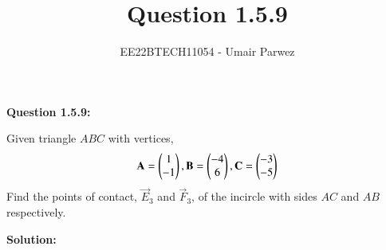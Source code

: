\documentclass[journal,12pt,twocolumn]{IEEEtran}
\theoremstyle{remark}
\begin{document}



\vspace{3cm}

\title{
	Question 1.5.9
}

\author{
	EE22BTECH11054 - Umair Parwez
}	

\maketitle
\newpage


\renewcommand{\thefigure}{\theenumi}
\renewcommand{\thetable}{\theenumi}


\textbf{Question 1.5.9:}

Given triangle $ABC$ with vertices, 
\begin{align}
	\mathbf{A} = \begin{pmatrix}1\\ -1\end{pmatrix}, \mathbf{B} = \begin{pmatrix}-4\\ 6\end{pmatrix}, \mathbf{C} = \begin{pmatrix}-3\\ -5\end{pmatrix}
\end{align}
Find the points of contact, $\vec{E}_3$ and $\vec{F}_3$, of the incircle with sides $AC$ and $AB$ respectively.

\textbf{Solution:}
\end{document}
